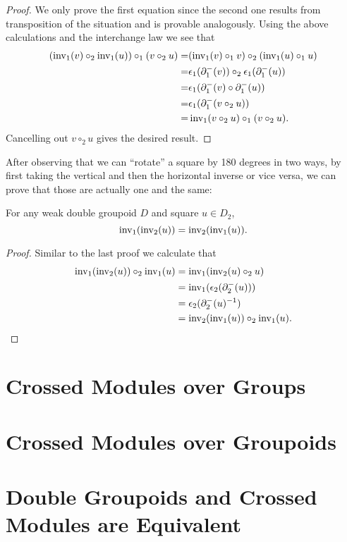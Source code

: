 \begin{proof}
We only prove the first equation since the second one results from transposition
of the situation and is provable analogously.
Using the above calculations and the interchange law we see that
\begin{align*}
(\operatorname{inv_1}(v) \circ_2 \operatorname{inv_1}(u)) \circ_1 (v \circ_2 u)
= 	& (\operatorname{inv_1}(v) \circ_1 v) \circ_2 (\operatorname{inv_1}(u) \circ_1 u) \\
= 	& \epsilon_1(\partial^-_1(v)) \circ_2 \epsilon_1(\partial^-_1(u)) \\
=	& \epsilon_1(\partial^-_1(v) \circ \partial^-_1(u)) \\
=	& \epsilon_1(\partial^-_1(v \circ_2 u)) \\
=	& \operatorname{inv_1}(v \circ_2 u) \circ_1 (v \circ_2 u) \text{.}
\end{align*}
Cancelling out $v \circ_2 u$ gives the desired result.
\end{proof}

After observing that we can ``rotate'' a square by 180 degrees in two ways, by first
taking the vertical and then the horizontal inverse or vice versa, we can prove
that those are actually one and the same:

\begin{lemma} \label{thm:rotate-180}
For any weak double groupoid $D$ and square $u \in D_2$,
\begin{equation*}
\operatorname{inv_1}(\operatorname{inv_2}(u)) = \operatorname{inv_2}(\operatorname{inv_1}(u)) \text{.}
\end{equation*}
\end{lemma}

\begin{proof}
Similar to the last proof we calculate that
\begin{align*}
\operatorname{inv_1}(\operatorname{inv_2}(u)) \circ_2 \operatorname{inv_1}(u)
	&= \operatorname{inv_1}(\operatorname{inv_2}(u) \circ_2 u) \\
	&= \operatorname{inv_1}(\epsilon_2(\partial^-_2(u))) \\
	&= \epsilon_2(\partial^-_2(u)^{-1}) \\
	&= \operatorname{inv_2}(\operatorname{inv_1}(u)) \circ_2 \operatorname{inv_1}(u) \text{.}
\end{align*}
\end{proof}


\section{Crossed Modules over Groups}

\section{Crossed Modules over Groupoids}

\section{Double Groupoids and Crossed Modules are Equivalent}






